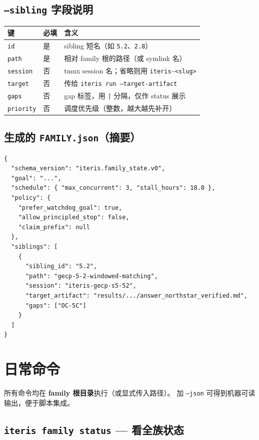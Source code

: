 \documentclass[11pt,a4paper]{ctexart}
\begin{document}
\subsection{\texttt{--sibling} 字段说明}

\begin{center}
\begin{tabular}{llp{7.5cm}}
\toprule
键 & 必填 & 含义 \\
\midrule
\texttt{id} & 是 & sibling 短名（如 \texttt{5.2}、\texttt{2.8}） \\
\texttt{path} & 是 & 相对 family 根的路径（或 symlink 名） \\
\texttt{session} & 否 & tmux session 名；省略则用 \texttt{iteris-<slug>} \\
\texttt{target} & 否 & 传给 \texttt{iteris run --target-artifact} \\
\texttt{gaps} & 否 & gap 标签，用 \texttt{|} 分隔，仅作 status 展示 \\
\texttt{priority} & 否 & 调度优先级（整数，越大越先补开） \\
\bottomrule
\end{tabular}
\end{center}

\subsection{生成的 \texttt{FAMILY.json}（摘要）}

\begin{lstlisting}[style=json]
{
  "schema_version": "iteris.family_state.v0",
  "goal": "...",
  "schedule": { "max_concurrent": 3, "stall_hours": 18.0 },
  "policy": {
    "prefer_watchdog_goal": true,
    "allow_principled_stop": false,
    "claim_prefix": null
  },
  "siblings": [
    {
      "sibling_id": "5.2",
      "path": "gecp-5-2-windowed-matching",
      "session": "iteris-gecp-s5-52",
      "target_artifact": "results/.../answer_northstar_verified.md",
      "gaps": ["OC-5C"]
    }
  ]
}
\end{lstlisting}

\section{日常命令}

所有命令均在 \textbf{family 根目录}执行（或显式传入路径）。
加 \texttt{--json} 可得到机器可读输出，便于脚本集成。

\subsection{\texttt{iteris family status} — 看全族状态}
\end{document}
